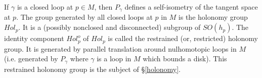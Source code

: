\documentclass[12pt]{amsart}
\theoremstyle{definition}
\theoremstyle{remark}
\begin{document}
If $\gamma$ is a closed loop at $p\in M$, then $P_\gamma$ defines a self-isometry of the tangent space at $p$. The group generated by all closed loops at $p$ in $M$ is the holonomy group $Hol_p$. It is a (possibly nonclosed and disconnected) subgroup of $SO(h_p)$. The identity component $Hol^o_p$ of $Hol_p$ is called the restrained (or, restricted) holonomy group. It is generated by parallel translation around nulhomotopic loops in $M$ (i.e. generated by $P_\gamma$ where $\gamma$ is a loop in $M$ which bounds a disk). This restrained holonomy group is the subject of \S\ref{holonomy}.     





\end{document}
